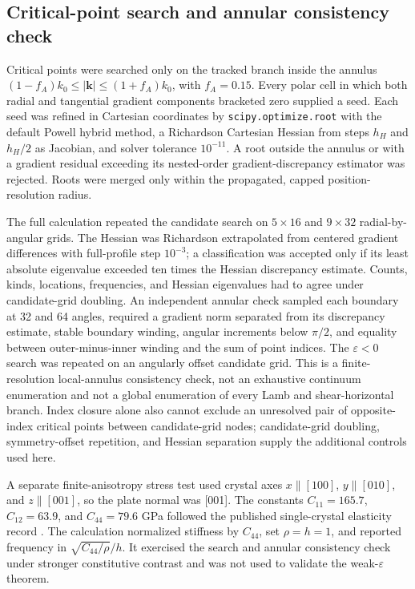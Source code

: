 \subsection{Critical-point search and annular consistency check}

Critical points were searched only on the tracked branch inside the annulus
\((1-f_A)k_0\leq|\boldsymbol k|\leq(1+f_A)k_0\), with \(f_A=0.15\).
Every polar cell in which both radial and tangential gradient components
bracketed zero supplied a seed.  Each seed was refined in Cartesian
coordinates by \texttt{scipy.optimize.root} with the default Powell hybrid
method, a Richardson Cartesian Hessian from steps \(h_H\) and \(h_H/2\) as
Jacobian, and solver tolerance
\(10^{-11}\).  A root outside the annulus or with a gradient residual exceeding
its nested-order gradient-discrepancy estimator was rejected.  Roots were
merged only within the propagated, capped position-resolution radius.

The full calculation repeated the candidate search on \(5\times16\) and
\(9\times32\) radial-by-angular grids.  The Hessian was Richardson extrapolated
from centered gradient differences with full-profile step \(10^{-3}\); a
classification was accepted only if its least absolute eigenvalue exceeded
ten times the Hessian discrepancy estimate.  Counts, kinds, locations,
frequencies, and Hessian eigenvalues had to agree under candidate-grid
doubling.  An
independent annular check sampled each boundary at 32 and 64 angles, required a
gradient norm separated from its discrepancy estimate, stable boundary
winding, angular increments below \(\pi/2\), and equality between outer-minus-inner
winding and the sum of point indices.  The \(\varepsilon<0\) search was repeated
on an angularly offset candidate grid.  This is a finite-resolution
local-annulus consistency check, not an exhaustive continuum enumeration and
not a global enumeration of every Lamb and shear-horizontal branch.  Index
closure alone also cannot exclude an unresolved pair of
opposite-index critical points between candidate-grid nodes; candidate-grid
doubling, symmetry-offset repetition, and Hessian separation supply the
additional controls used here.

A separate finite-anisotropy stress test used crystal axes
\(x\parallel[100]\), \(y\parallel[010]\), and \(z\parallel[001]\), so the
plate normal was [001].  The constants \(C_{11}=165.7\), \(C_{12}=63.9\), and
\(C_{44}=79.6\) GPa followed the published single-crystal elasticity record
\citep{zhang2014silicon}.  The calculation normalized stiffness by \(C_{44}\),
set \(\rho=h=1\), and reported frequency in
\(\sqrt{C_{44}/\rho}/h\).  It exercised the search and annular consistency check
under stronger constitutive contrast and was not used to validate the
weak-\(\varepsilon\) theorem.

